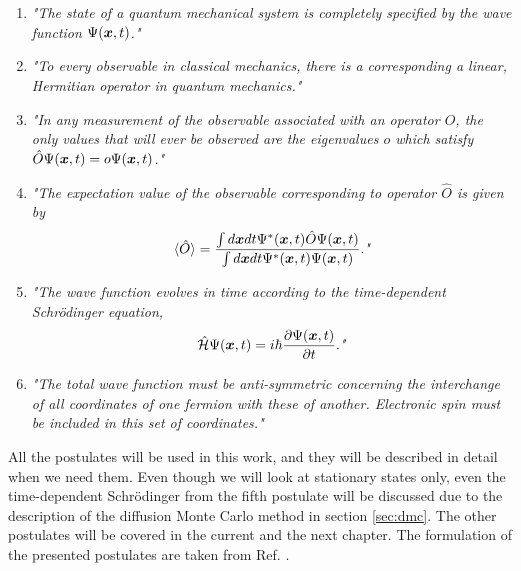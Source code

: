 \begin{enumerate}
	\item \textit{"The state of a quantum mechanical system is completely specified by the wave function $\Psi(\boldsymbol{{x}},t)$."}
	
	\item \textit{"To every observable in classical mechanics, there is a corresponding a linear, Hermitian operator in quantum mechanics."}
	
	\item \textit{"In any measurement of the observable associated with an operator $\hat{O}$, the only values that will ever be observed are the eigenvalues $o$ which satisfy $\hat{O}\Psi(\boldsymbol{{x}},t)=o\Psi(\boldsymbol{{x}},t)$."}
	
	\item \textit{"The expectation value of the observable corresponding to operator $\hat{O}$ is given by
		$$\langle\hat{O}\rangle=\frac{\int d\boldsymbol{{x}}dt\Psi^*(\boldsymbol{{x}},t)\hat{O}\Psi(\boldsymbol{{x}},t)}{\int d\boldsymbol{{x}}dt\Psi^*(\boldsymbol{{x}},t)\Psi(\boldsymbol{{x}},t)}.\textit{"}$$}
	
	\item \textit{"The wave function evolves in time according to the time-dependent Schrödinger equation,
		$$\hat{\mathcal{H}}\Psi(\boldsymbol{{x}},t)=i\hbar\frac{\partial\Psi(\boldsymbol{{x}},t)}{\partial t}.\textit{"}$$}
	
	\item \textit{"The total wave function must be anti-symmetric concerning the interchange of all coordinates of one fermion with these of another. Electronic spin must be included in this set of coordinates."} 
\end{enumerate}
All the postulates will be used in this work, and they will be described in detail when we need them. Even though we will look at stationary states only, even the time-dependent Schrödinger from the fifth postulate will be discussed due to the description of the diffusion Monte Carlo method in section \ref{sec:dmc}. The other postulates will be covered in the current and the next chapter. The formulation of the presented postulates are taken from Ref. \cite{sherrill_david_postulates_2003}.

